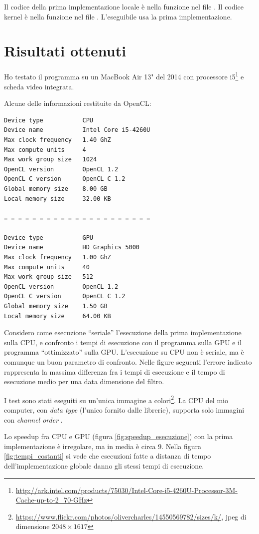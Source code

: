 \documentclass[10pt]{myarticle}
\begin{document}
Il codice della prima implementazione locale \`e nella funzione  nel file .
Il codice kernel \`e nella funzione  nel file .
L'eseguibile  usa la prima implementazione.

\section{Risultati ottenuti}

Ho testato il programma su un MacBook Air 13" del 2014 con processore i5\footnote{\url{http://ark.intel.com/products/75030/Intel-Core-i5-4260U-Processor-3M-Cache-up-to-2_70-GHz}} e scheda video integrata.

Alcune delle informazioni restituite da OpenCL:
\begin{verbatim}
Device type           CPU
Device name           Intel Core i5-4260U
Max clock frequency   1.40 GhZ
Max compute units     4
Max work group size   1024
OpenCL version        OpenCL 1.2 
OpenCL C version      OpenCL C 1.2 
Global memory size    8.00 GB
Local memory size     32.00 KB

= = = = = = = = = = = = = = = = = = = = =

Device type           GPU
Device name           HD Graphics 5000
Max clock frequency   1.00 GhZ
Max compute units     40
Max work group size   512
OpenCL version        OpenCL 1.2 
OpenCL C version      OpenCL C 1.2 
Global memory size    1.50 GB
Local memory size     64.00 KB
\end{verbatim}

Considero come esecuzione ``seriale'' l'esecuzione della prima implementazione sulla CPU, e confronto i tempi di esecuzione con il programma sulla GPU e il programma ``ottimizzato'' sulla GPU.
L'esecuzione su CPU non \`e seriale, ma \`e comunque un buon parametro di confronto.
Nelle figure seguenti l'errore indicato rappresenta la massima differenza fra i tempi di esecuzione e il tempo di esecuzione medio per una data dimensione del filtro.

I test sono stati eseguiti su un'unica immagine a colori\footnote{\url{https://www.flickr.com/photos/olivercharles/14550569782/sizes/k/}, jpeg di dimensione $2048 \times 1617$}.
La CPU del mio computer, con \emph{data type}  (l'unico fornito dalle librerie), supporta solo immagini con \emph{channel order} .

Lo speedup fra CPU e GPU (figura \ref{fig:speedup_esecuzione}) con la prima implementazione \`e irregolare, ma in media \`e circa 9.
Nella figura \ref{fig:tempi_costanti} si vede che esecuzioni fatte a distanza di tempo dell'implementazione globale danno gli stessi tempi di esecuzione.
\end{document}
